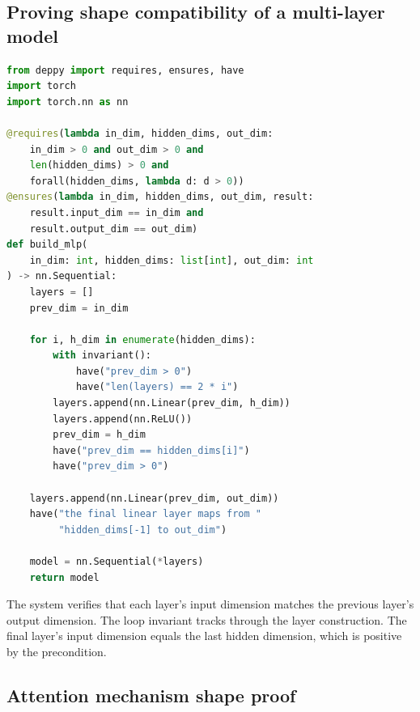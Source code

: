 \documentclass[11pt]{report}
\DeclareRobustCommand{\py}[1]{\texttt{\detokenize{#1}}}
\theoremstyle{definition}
\theoremstyle{plain}
\begin{document}
\subsection{Proving shape compatibility of a multi-layer model}

\begin{lstlisting}[style=deppy,language=Python]
from deppy import requires, ensures, have
import torch
import torch.nn as nn

@requires(lambda in_dim, hidden_dims, out_dim:
    in_dim > 0 and out_dim > 0 and
    len(hidden_dims) > 0 and
    forall(hidden_dims, lambda d: d > 0))
@ensures(lambda in_dim, hidden_dims, out_dim, result:
    result.input_dim == in_dim and
    result.output_dim == out_dim)
def build_mlp(
    in_dim: int, hidden_dims: list[int], out_dim: int
) -> nn.Sequential:
    layers = []
    prev_dim = in_dim

    for i, h_dim in enumerate(hidden_dims):
        with invariant():
            have("prev_dim > 0")
            have("len(layers) == 2 * i")
        layers.append(nn.Linear(prev_dim, h_dim))
        layers.append(nn.ReLU())
        prev_dim = h_dim
        have("prev_dim == hidden_dims[i]")
        have("prev_dim > 0")

    layers.append(nn.Linear(prev_dim, out_dim))
    have("the final linear layer maps from "
         "hidden_dims[-1] to out_dim")

    model = nn.Sequential(*layers)
    return model
\end{lstlisting}

The system verifies that each \py{nn.Linear} layer's input dimension matches
the previous layer's output dimension. The loop invariant tracks \py{prev_dim}
through the layer construction. The final layer's input dimension equals the
last hidden dimension, which is positive by the precondition.

\subsection{Attention mechanism shape proof}
\end{document}

